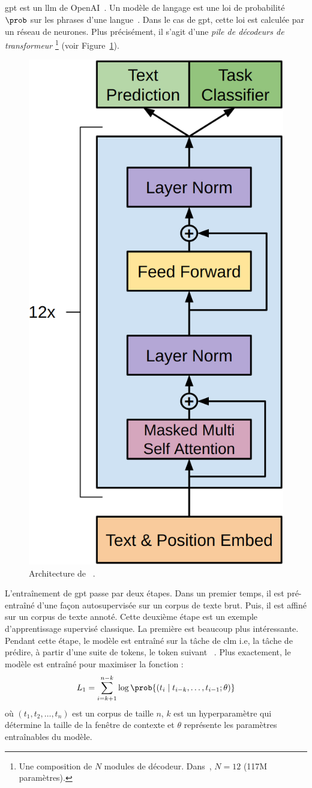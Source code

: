 \subsection{}

\Gls{gpt} est un \gls{llm} de OpenAI~\cite{Radford_Narasimhan_Salimans_Sutskever}.
Un modèle de langage est une loi de probabilité \(\prob\) sur les phrases d'une langue~\cite{routledge}.
Dans le cas de \gls{gpt}, cette loi est calculée par un réseau de neurones.
Plus précisément, il s'agit d'une \emph{pile de décodeurs de transformeur}%
\footnote{%
    Une composition de \(N\) modules de décodeur. 
    Dans~\cite{Radford_Narasimhan_Salimans_Sutskever}, \(N=12\)
    (117M paramètres).
} (voir Figure~\ref{fig.gpt}).

\begin{figure}[hbt]
    \centering
    \includegraphics[height=.5\linewidth]{assets/images/gpt.png}
    \caption[Architecture de .]%
    {Architecture de ~\cite{Radford_Narasimhan_Salimans_Sutskever}.}
    \label{fig.gpt}
\end{figure}

L'entraînement de \gls{gpt} passe par deux étapes.
Dans un premier temps, il est pré-entraîné d'une façon autosupervisée sur un corpus de texte brut.
Puis, il est affiné sur un corpus de texte annoté.
Cette deuxième étape est un exemple d'apprentissage supervisé classique.
La première est beaucoup plus intéressante.
Pendant cette étape, le modèle est entraîné sur la tâche de \gls{clm}
i.e, la tâche de prédire, à partir d'une suite de tokens, le token suivant%
~\cite{Radford_Narasimhan_Salimans_Sutskever}.
Plus exactement, le modèle est entraîné pour maximiser la fonction :
\begin{equation}
    \label{eq.gpt-pretrain-loss}
    L_1=\sum_{i=k+1}^{n-k} \log\prob{\left(t_i \mid t_{i-k}, \ldots, t_{i-1} ; \theta\right)}
\end{equation}
où \(\left(t_1, t_2, \ldots, t_n\right)\) est un corpus de taille \(n\), 
\(k\) est un hyperparamètre qui détermine la taille de la fenêtre de contexte
et \(\theta\) représente les paramètres entraînables du modèle.

